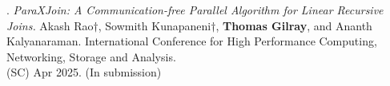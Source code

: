 \paper. \textit{ParaXJoin: A Communication-free Parallel Algorithm for Linear Recursive Joins.}
Akash Rao$\dagger$, Sowmith Kunapaneni$\dagger$, \textbf{Thomas Gilray}, and Ananth Kalyanaraman.
International Conference for High Performance Computing, Networking, Storage and Analysis.
\\(SC) Apr 2025. (In submission)
\\ \vspace{-0.1cm}\\
